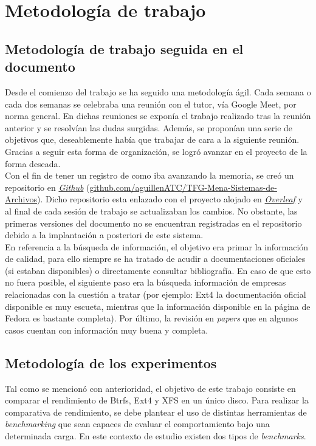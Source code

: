 \cleardoublepage
\clearpage{}

\chapter[Metodología de trabajo]{Metodología de trabajo}
\section{Metodología de trabajo seguida en el documento}
Desde el comienzo del trabajo se ha seguido una  metodología ágil. Cada semana o cada dos semanas se celebraba una reunión con el tutor, vía Google Meet, por norma general. En dichas reuniones se exponía el trabajo realizado tras la reunión anterior y se resolvían las dudas surgidas. Además, se proponían una serie de objetivos que, deseablemente había que trabajar de cara a la siguiente reunión. Gracias a seguir esta forma de organización, se logró avanzar en el proyecto de la forma deseada. \\

Con el fin de tener un registro de como iba avanzando la memoria, se creó un repositorio en  \href{http://www.github.com}{\textit{Github}} (\url{github.com/aguillenATC/TFG-Mena-Sistemas-de-Archivos}). Dicho repositorio esta enlazado con el proyecto alojado en \href{http://www.overleaf.com}{\textit{Overleaf}} y al final de cada sesión de trabajo se actualizaban los cambios. No obstante, las primeras versiones del documento no se encuentran registradas en el repositorio debido a la implantación a posteriori de este sistema.\\

En referencia a la búsqueda de información, el objetivo era primar la información de calidad, para ello siempre se ha tratado de acudir a documentaciones oficiales (si estaban disponibles) o directamente consultar bibliografía. En caso de que esto no fuera posible, el siguiente paso era la búsqueda información de empresas relacionadas con la cuestión a tratar (por ejemplo: Ext4 la documentación oficial disponible es muy escueta, mientras que la información disponible en la página de Fedora es bastante completa). Por último, la revisión en \textit{papers} que en algunos casos cuentan con información muy buena y completa.

\section{Metodología de los experimentos}
Tal como se mencionó con anterioridad, el objetivo de este trabajo consiste en comparar el rendimiento de Btrfs, Ext4 y XFS en un único disco. Para realizar la comparativa de rendimiento, se debe plantear el uso de distintas herramientas de \textit{benchmarking} que sean capaces de evaluar el comportamiento bajo una determinada carga. En este contexto de estudio existen dos tipos de \textit{benchmarks}. \\

